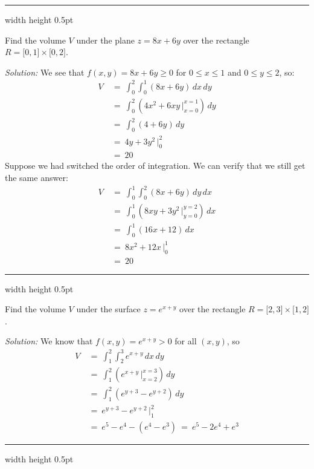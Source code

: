 \vspace{3mm}
\hrule width \textwidth height 0.5pt
\begin{exmp}\label{exmp:volplane}
 Find the volume $V$ under the plane $z=8x+6y$ over the rectangle $R = \lbrack 0,1 \rbrack \times \lbrack 0,2 \rbrack$.
 \vspace{1mm}
 \par\noindent \emph{Solution:} We see that $f(x,y)=8x+6y \ge 0$ for $0 \le x \le 1$ and $0 \le y \le 2$, so:
 \begin{align*}
  V ~&=~ \int_0^2 \int_0^1 (8x+6y)\,dx \,dy\\
   &=~ \int_0^2 \left( 4x^2 + 6xy \,\Big|_{x=0}^{x=1} \right) \,dy\\
   &=~ \int_0^2 (4+6y) \,dy\\
   &=~ 4y+3y^2 \,\Big|_0^2\\
   &=~ 20
 \end{align*}
 Suppose we had switched the order of integration. We can verify that we still get the same answer:
 \begin{align*}
  V ~&=~ \int_0^1 \int_0^2 (8x+6y)\,dy \,dx\\
   &=~ \int_0^1 \left( 8xy + 3y^2 \,\Big|_{y=0}^{y=2} \right) \,dx\\
   &=~ \int_0^1 (16x+12) \,dx\\
   &=~ 8x^2 + 12x \,\Big|_0^1\\
   &=~ 20
 \end{align*}
\end{exmp}
\hrule width \textwidth height 0.5pt
\begin{exmp}
 Find the volume $V$ under the surface $z=e^{x+y}$ over the rectangle $R = \lbrack 2,3 \rbrack \times \lbrack 1,2
  \rbrack$.\vspace{1mm}
 \par\noindent \emph{Solution:} We know that $f(x,y)=e^{x+y} > 0$ for all $(x,y)$, so
 \begin{align*}
  V ~&=~ \int_1^2 \int_2^3 e^{x+y} \,dx \,dy\\
   &=~ \int_1^2 \left( e^{x+y} \,\Big|_{x=2}^{x=3} \right) \,dy\\
   &=~ \int_1^2 (e^{y+3} - e^{y+2}) \,dy\\
   &=~ e^{y+3} - e^{y+2} \,\Big|_1^2\\
   &=~ e^5 - e^4 - ( e^4 - e^3 ) ~=~ e^5 - 2e^4 + e^3
 \end{align*}
\end{exmp}
\hrule width \textwidth height 0.5pt
\vspace{3mm}

